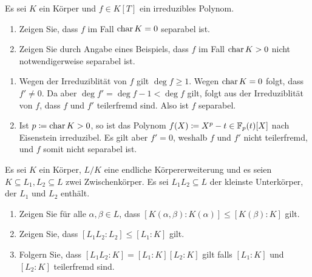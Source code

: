\begin{question}[subtitle = Zur Separablität]
  Es sei $K$ ein Körper und $f \in K[T]$ ein irreduzibles Polynom.
  \begin{enumerate}
    \item
      Zeigen Sie, dass $f$ im Fall $\operatorname{char} K = 0$ separabel ist.
    \item
      Zeigen Sie durch Angabe eines Beispiels, dass $f$ im Fall $\operatorname{char} K > 0$ nicht notwendigerweise separabel ist.
  \end{enumerate}
\end{question}


\begin{solution}
  \begin{enumerate}
    \item
      Wegen der Irreduziblität von $f$ gilt $\deg f \geq 1$.
      Wegen $\operatorname{char} K = 0$ folgt, dass $f' \neq 0$.
      Da aber $\deg f' = \deg f - 1 < \deg f$ gilt, folgt aus der Irreduziblität von $f$, dass $f$ und $f'$ teilerfremd sind.
      Also ist $f$ separabel.
    \item
      Ist $p \coloneqq \operatorname{char} K > 0$, so ist das Polynom $f(X) \coloneqq X^p - t \in \mathbb{F}_p(t)[X]$ nach Eisenstein irreduzibel.
      Es gilt aber $f' = 0$, weshalb $f$ und $f'$ nicht teilerfremd, und $f$ somit nicht separabel ist.
  \end{enumerate}
\end{solution}


\begin{question}[subtitle = Grad des Körperkompositums]
  Es sei $K$ ein Körper, $L/K$ eine endliche Körpererweiterung und es seien $K \subseteq L_1, L_2 \subseteq L$ zwei Zwischenkörper.
  Es sei $L_1 L_2 \subseteq L$ der kleinste Unterkörper, der $L_1$ und $L_2$ enthält.
  \begin{enumerate}
    \item
      Zeigen Sie für alle $\alpha, \beta \in L$, dass $[K(\alpha, \beta) : K(\alpha)] \leq [K(\beta) : K]$ gilt.
    \item
      Zeigen Sie, dass $[L_1 L_2 : L_2] \leq [L_1 : K]$ gilt.
    \item
      Folgern Sie, dass $[L_1 L_2 : K] = [L_1 : K] [L_2 : K]$ gilt falls $[L_1 : K]$ und $[L_2 : K]$ teilerfremd sind.
  \end{enumerate}
\end{question}


